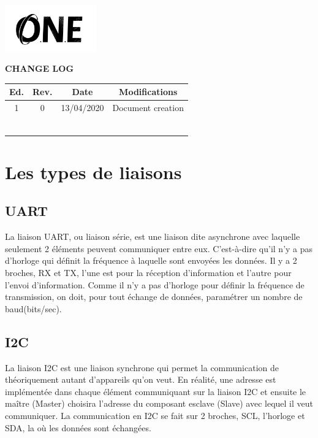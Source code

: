 \documentclass[12pt, a4paper, openright]{report}
\begin{document}
	\newpage
	\pagestyle{changelog}   %
	\hfill\includegraphics[height=2cm]{logooneblack}
	\begin{center}
		\textbf{\Large CHANGE LOG}
		\vspace{1cm}
		
		\begin{tabular}{|c|c|c|c|}
			\hline
			\rowcolor{lightgray}
			Ed. & Rev. & Date & Modifications\\
			\hline
			1 & 0 & 13/04/2020 & \qquad \qquad \qquad Document creation \qquad \qquad \qquad \qquad\\
			\hline  
			&  & & \\ 
			\hline    
			&  & & \\ 
			\hline
			&  & & \\ 
			\hline
			&  & & \\ 
			\hline
			&  & & \\ 
			\hline
			&  & & \\ 
			\hline   
		\end{tabular}
	\end{center}
	\tableofcontents %
	\newpage
    
    
    
    
	
   \section{Les types de liaisons}
\subsection{UART}
La liaison UART, ou liaison série, est une liaison dite asynchrone avec laquelle seulement 2 éléments peuvent communiquer entre eux. C’est-à-dire qu’il n’y a pas d’horloge qui définit la fréquence à laquelle sont envoyées les données. Il y a 2 broches, RX et TX, l’une est pour la réception d’information et l’autre pour l’envoi d’information. Comme il n’y a pas d’horloge pour définir la fréquence de transmission, on doit, pour tout échange de données, paramétrer un nombre de baud(bits/sec).
\subsection{I2C}
La liaison I2C est une liaison synchrone qui permet la communication de théoriquement autant d’appareils qu’on veut. En réalité, une adresse est implémentée dans chaque élément communiquant sur la liaison I2C et ensuite le maître (Master) choisira l’adresse du composant esclave (Slave) avec lequel il veut communiquer. La communication en I2C se fait sur 2 broches, SCL, l’horloge et SDA, la où les données sont échangées.
\end{document}
